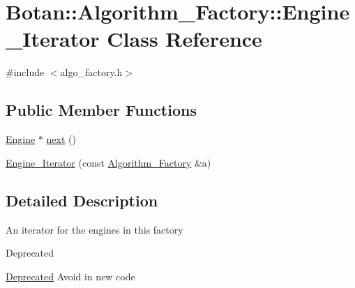 \hypertarget{classBotan_1_1Algorithm__Factory_1_1Engine__Iterator}{\section{Botan\-:\-:Algorithm\-\_\-\-Factory\-:\-:Engine\-\_\-\-Iterator Class Reference}
\label{classBotan_1_1Algorithm__Factory_1_1Engine__Iterator}
}


{\ttfamily \#include $<$algo\-\_\-factory.\-h$>$}

\subsection*{Public Member Functions}
\begin{DoxyCompactItemize}
\item 
\hyperlink{classBotan_1_1Engine}{Engine} $\ast$ \hyperlink{classBotan_1_1Algorithm__Factory_1_1Engine__Iterator_ac77a15bec64fa753a07cc26c6e7ca6b9}{next} ()
\item 
\hyperlink{classBotan_1_1Algorithm__Factory_1_1Engine__Iterator_a4a0c392c339a1220a716a3c407a0d83b}{Engine\-\_\-\-Iterator} (const \hyperlink{classBotan_1_1Algorithm__Factory}{Algorithm\-\_\-\-Factory} \&a)
\end{DoxyCompactItemize}


\subsection{Detailed Description}
An iterator for the engines in this factory \begin{DoxyRefDesc}{Deprecated}
\item[\hyperlink{deprecated__deprecated000001}{Deprecated}]Avoid in new code \end{DoxyRefDesc}


